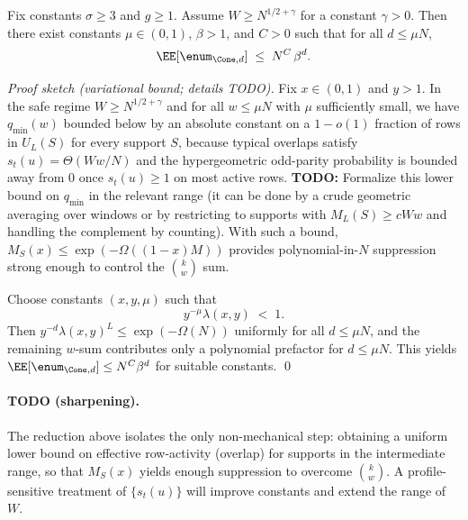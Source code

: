 \begin{theorem}
\label{thm:outer-local-expander-spectrum-reduction}
Fix constants $\sigma\ge 3$ and $g\ge 1$.
Assume $W\ge N^{1/2+\gamma}$ for a constant $\gamma>0$.
Then there exist constants $\mu\in(0,1)$, $\beta>1$, and $C>0$ such that for all $d\le \mu N$,
\[
\EE[\enum_{\Cone,d}] \;\le\; N^{C}\,\beta^{d}.
\]
\end{theorem}

\begin{proof}[Proof sketch (variational bound; details TODO)]
Fix $x\in(0,1)$ and $y>1$.
In the safe regime $W\ge N^{1/2+\gamma}$ and for all $w\le \mu N$ with $\mu$ sufficiently small, we have
$q_{\min}(w)$ bounded below by an absolute constant on a $1-o(1)$ fraction of rows in $U_L(S)$ for every support $S$,
because typical overlaps satisfy $s_t(u)=\Theta(W w/N)$ and the hypergeometric odd-parity probability is bounded away from
$0$ once $s_t(u)\ge 1$ on most active rows.
\noindent\textbf{TODO:} Formalize this lower bound on $q_{\min}$ in the relevant range (it can be done by a crude
geometric averaging over windows or by restricting to supports with $M_L(S)\ge cWw$ and handling the complement by
counting).
With such a bound, $M_S(x)\le \exp(-\Omega((1-x)M))$ provides polynomial-in-$N$ suppression strong enough to control the
$\binom{k}{w}$ sum.

Choose constants $(x,y,\mu)$ such that
\[
y^{-\mu}\lambda(x,y)\;<\;1.
\]
Then $y^{-d}\lambda(x,y)^L\le \exp(-\Omega(N))$ uniformly for all $d\le \mu N$, and the remaining $w$-sum contributes only
a polynomial prefactor for $d\le \mu N$.
This yields $\EE[\enum_{\Cone,d}]\le N^{C}\beta^{d}$ for suitable constants.
\qed
\end{proof}

\paragraph{TODO (sharpening).}
The reduction above isolates the only non-mechanical step: obtaining a uniform lower bound on effective row-activity
(overlap) for supports in the intermediate range, so that $M_S(x)$ yields enough suppression to overcome $\binom{k}{w}$.
A profile-sensitive treatment of $\{s_t(u)\}$ will improve constants and extend the range of $W$.

